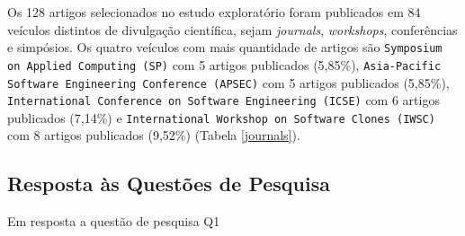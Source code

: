 Os 128 artigos selecionados no estudo exploratório foram publicados em 84 veículos distintos de divulgação científica, sejam \textit{journals}, \textit{workshops}, conferências e simpósios. Os quatro veículos com mais quantidade de artigos são \texttt{Symposium on Applied Computing (SP)} com 5 artigos publicados (5,85\%), \texttt{Asia-Pacific Software Engineering Conference (APSEC)} com 5 artigos publicados (5,85\%), \texttt{International Conference on Software Engineering (ICSE)} com 6 artigos publicados (7,14\%) e \texttt{International Workshop on Software Clones (IWSC)} com 8 artigos publicados (9,52\%) (Tabela \ref{journals}).

\begin{table}[ht]
	\centering
	\caption{Principais Veículos de Publicação}
	\label{journals}
\end{table}

\subsection{Resposta às Questões de Pesquisa}
Em resposta a questão de pesquisa Q1
\newline

\begin{center}
	\newline
\end{center}

